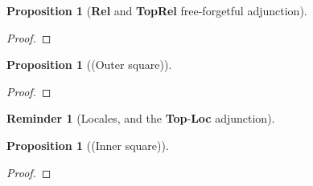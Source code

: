 \documentclass{tufte-handout}
\theoremstyle{definition}
\newtheorem{proposition}[theorem]{Proposition}
\newtheorem{rem}[theorem]{Reminder}
\begin{document}
\begin{proposition}[\textbf{Rel} and \textbf{TopRel} free-forgetful adjunction]

\begin{proof}

\end{proof}
\end{proposition}


\begin{proposition}[(Outer square)]

\begin{proof}

\end{proof}
\end{proposition}

\begin{rem}[Locales, and the \textbf{Top}-\textbf{Loc} adjunction]

\end{rem}

\begin{proposition}[(Inner square)]

\begin{proof}

\end{proof}
\end{proposition}
\end{document}
